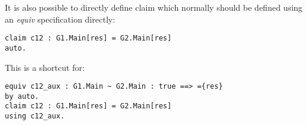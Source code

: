 It is also possible to directly define claim which normally should be 
defined using an \textit{equiv} specification directly:
\begin{verbatim}
claim c12 : G1.Main[res] = G2.Main[res]
auto.
\end{verbatim}
This is a shortcut for: 
\begin{verbatim}
equiv c12_aux : G1.Main ~ G2.Main : true ==> ={res}
by auto.
claim c12 : G1.Main[res] = G2.Main[res]
using c12_aux.
\end{verbatim}

